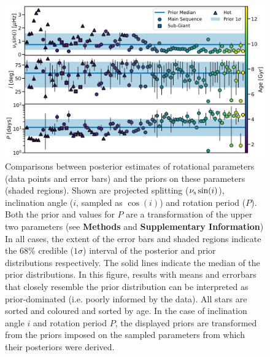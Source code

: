 \begin{figure}
	\centering
	\includegraphics[width=\textwidth]{Images/priors.png}
	\caption{Comparisons between posterior estimates of rotational parameters (data points and error bars) and the priors on these parameters (shaded regions). Shown are projected splitting ($\nu_{\rm s}\sin(i)$), inclination angle ($i$, sampled as $\cos(i)$) and rotation period ($P$). Both the prior and values for $P$ are a transformation of the upper two parameters (see \textbf{Methods} and \textbf{Supplementary Information}) In all cases, the extent of the error bars and shaded regions indicate the 68\% credible ($1\sigma$) interval of the posterior and prior distributions respectively. The solid lines indicate the median of the prior distributions. In this figure, results with means and errorbars that closely resemble the prior distribution can be interpreted as prior-dominated (i.e. poorly informed by the data). All stars are sorted and coloured and sorted by age. In the case of inclination angle $i$ and rotation period $P$, the displayed priors are transformed from the priors imposed on the sampled parameters from which their posteriors were derived.}
	\label{fig:priors}
\end{figure}

